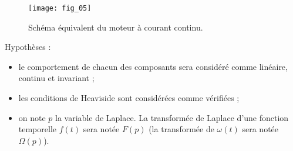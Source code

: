 
\begin{figure}[!h]
\centering
\texttt{[image: fig\_05]}

\caption{Schéma équivalent du moteur à courant continu.}

\label{btp_fig_05}
\end{figure}




%	
Hypothèses :
\begin{itemize}
\item le comportement de chacun des composants sera considéré comme linéaire, continu et invariant ;
\item les conditions de Heaviside sont considérées comme vérifiées ;
\item on note $p$ la variable de Laplace. La transformée de Laplace d'une fonction temporelle $f(t)$ sera notée $F(p)$ (la transformée de $\omega(t)$ sera notée $\Omega(p)$).
\end{itemize}

\fi

%
%
%

